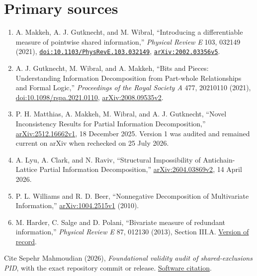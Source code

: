 \documentclass[11pt]{article}
\begin{document}
\section*{Primary sources}
\begin{enumerate}
  \item A. Makkeh, A. J. Gutknecht, and M. Wibral,
  ``Introducing a differentiable measure of pointwise shared information,''
  \emph{Physical Review E} 103, 032149 (2021),
  \href{https://doi.org/10.1103/PhysRevE.103.032149}{\nolinkurl{doi:10.1103/PhysRevE.103.032149}},
  \href{https://arxiv.org/abs/2002.03356v5}{\nolinkurl{arXiv:2002.03356v5}}.
  \item A. J. Gutknecht, M. Wibral, and A. Makkeh,
  ``Bits and Pieces: Understanding Information Decomposition from Part-whole
  Relationships and Formal Logic,'' \emph{Proceedings of the Royal Society A}
  477, 20210110 (2021),
  \href{https://doi.org/10.1098/rspa.2021.0110}{doi:10.1098/rspa.2021.0110},
  \href{https://arxiv.org/abs/2008.09535v2}{arXiv:2008.09535v2}.
  \item P. H. Matthias, A. Makkeh, M. Wibral, and A. J. Gutknecht,
  ``Novel Inconsistency Results for Partial Information Decomposition,''
  \href{https://arxiv.org/abs/2512.16662v1}{arXiv:2512.16662v1},
  18 December 2025.  Version 1 was audited and remained current on arXiv when
  rechecked on 25 July 2026.
  \item A. Lyu, A. Clark, and N. Raviv,
  ``Structural Impossibility of Antichain-Lattice Partial Information
  Decomposition,''
  \href{https://arxiv.org/abs/2604.03869v2}{arXiv:2604.03869v2},
  14 April 2026.
  \item P. L. Williams and R. D. Beer, ``Nonnegative Decomposition of
  Multivariate Information,''
  \href{https://arxiv.org/abs/1004.2515v1}{arXiv:1004.2515v1} (2010).
  \item M. Harder, C. Salge and D. Polani, ``Bivariate measure of redundant
  information,'' \emph{Physical Review E} 87, 012130 (2013), Section III.A.
  \href{https://doi.org/10.1103/PhysRevE.87.012130}{Version of record}.
\end{enumerate}

\smallskip\noindent
Cite Sepehr Mahmoudian (2026), \emph{Foundational validity audit of
shared-exclusions PID}, with the exact repository commit or release.
\href{https://github.com/sepahead/pid-rs/blob/main/CITATION.cff}{Software citation}.
\end{document}
